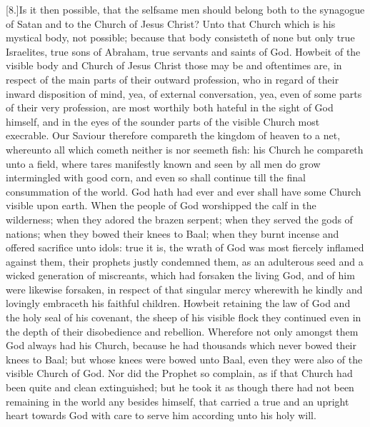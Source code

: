 [8.]Is it then possible, that the selfsame men should belong both to the synagogue of Satan and to the Church of Jesus Christ? Unto that Church which is his mystical body, not possible; because that body consisteth of none but only true Israelites, true sons of Abraham, true servants and saints of God. Howbeit of the visible body and Church of Jesus Christ those may be and oftentimes are, in respect of the main parts of their outward profession, who in regard of their inward disposition of mind, yea, of external conversation, yea, even of some parts of their very profession, are most worthily both hateful in the sight of God himself, and in the eyes of the sounder parts of the visible Church most execrable. Our Saviour therefore compareth the kingdom of  heaven to a net, whereunto all which cometh neither is nor seemeth fish: his Church he compareth unto a field, where tares manifestly known and seen by all men do grow intermingled with good corn, and even so shall continue till the final consummation of the world. God hath had ever and ever shall have some Church visible upon earth. When the people of God worshipped the calf in the wilderness; when they adored the brazen serpent; when they served the gods of nations; when they bowed their knees to Baal; when they burnt incense and offered sacrifice unto idols: true it is, the wrath of God was most fiercely inflamed against them, their prophets justly condemned them, as an adulterous seed and a wicked generation of miscreants, which had forsaken the living God, and of him were likewise forsaken, in respect of that singular mercy wherewith he kindly and lovingly embraceth his faithful children. Howbeit retaining the law of God and the holy seal of his covenant, the sheep of his visible flock they continued even in the depth of their disobedience and rebellion. Wherefore not only amongst them God always had his Church, because he had thousands which never bowed their knees to Baal; but whose knees were bowed unto Baal, even they were also of the visible Church of God. Nor did the Prophet so complain, as if that Church had been quite and clean extinguished; but he took it as though there had not been remaining in the world any besides himself, that carried a true and an upright heart towards God with care to serve him according unto his holy will.

